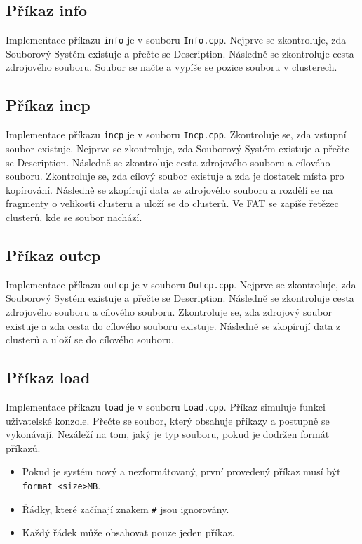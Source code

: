 \documentclass[12pt, a4paper]{article}
\begin{document}
\subsection{Příkaz info}
Implementace příkazu \texttt{info} je v souboru \texttt{Info.cpp}.
Nejprve se zkontroluje, zda Souborový Systém existuje a přečte se Description.
Následně se zkontroluje cesta zdrojového souboru.
Soubor se načte a vypíše se pozice souboru v clusterech.

\subsection{Příkaz incp}
Implementace příkazu \texttt{incp} je v souboru \texttt{Incp.cpp}.
Zkontroluje se, zda vstupní soubor existuje.
Nejprve se zkontroluje, zda Souborový Systém existuje a přečte se Description.
Následně se zkontroluje cesta zdrojového souboru a cílového souboru.
Zkontroluje se, zda cílový soubor existuje a zda je dostatek místa pro kopírování.
Následně se zkopírují data ze zdrojového souboru a rozdělí se na fragmenty o velikosti clusteru a uloží se do clusterů.
Ve FAT se zapíše řetězec clusterů, kde se soubor nachází.

\subsection{Příkaz outcp}
Implementace příkazu \texttt{outcp} je v souboru \texttt{Outcp.cpp}.
Nejprve se zkontroluje, zda Souborový Systém existuje a přečte se Description.
Následně se zkontroluje cesta zdrojového souboru a cílového souboru.
Zkontroluje se, zda zdrojový soubor existuje a zda cesta do cílového souboru existuje.
Následně se zkopírují data z clusterů a uloží se do cílového souboru.

\subsection{Příkaz load}
Implementace příkazu \texttt{load} je v souboru \texttt{Load.cpp}.
Příkaz simuluje funkci uživatelské konzole.
Přečte se soubor, který obsahuje příkazy a postupně se vykonávají.
Nezáleží na tom, jaký je typ souboru, pokud je dodržen formát příkazů.
\begin{itemize}
    \item Pokud je systém nový a nezformátovaný, první provedený příkaz musí být \texttt{format <size>MB}.
    \item Řádky, které začínají znakem \texttt{\#} jsou ignorovány.
    \item Každý řádek může obsahovat pouze jeden příkaz.
\end{itemize}
\end{document}
